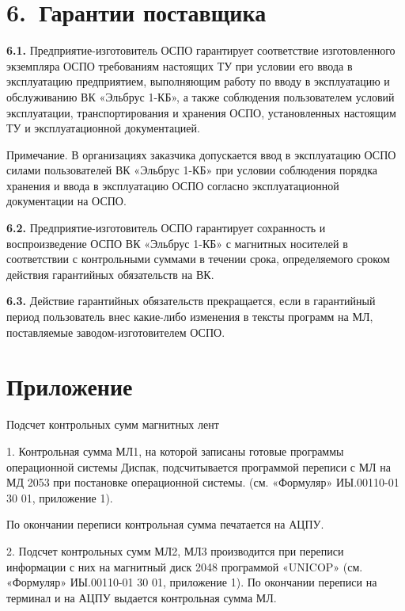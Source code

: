 \documentclass[11pt,a4paper]{article}
\begin{document}
\section*{6.~Гарантии поставщика}
\par\textbf{6.1.} Предприятие-изготовитель ОСПО гарантирует соответствие изготовленного экземпляра ОСПО требованиям настоящих ТУ при условии его ввода в эксплуатацию предприятием, выполняющим работу по вводу в эксплуатацию и обслуживанию ВК «Эльбрус 1-КБ», а также соблюдения пользователем условий эксплуатации, транспортирования и хранения ОСПО, установленных настоящим ТУ и эксплуатационной документацией.\par
Примечание. В организациях заказчика допускается ввод в эксплуатацию ОСПО силами пользователей ВК «Эльбрус 1-КБ» при условии соблюдения порядка хранения и ввода в эксплуатацию ОСПО согласно эксплуатационной документации на ОСПО.

\par\textbf{6.2.} Предприятие-изготовитель ОСПО гарантирует сохранность и воспроизведение ОСПО ВК «Эльбрус 1-КБ» с магнитных носителей в соответствии с контрольными суммами в течении срока, определяемого сроком действия гарантийных обязательств на ВК.\par
\par\textbf{6.3.} Действие гарантийных обязательств прекращается, если в гарантийный период пользователь внес какие-либо изменения в тексты программ на МЛ, поставляемые заводом-изготовителем ОСПО.\par
\section*{Приложение}
\begin{center}Подсчет контрольных сумм магнитных лент\end{center}
1. Контрольная сумма МЛ1, на которой записаны готовые программы операционной системы Диспак, подсчитывается программой переписи с МЛ на МД 2053 при постановке операционной системы. (см. «Формуляр» ИЫ.00110-01 30 01, приложение 1).

По окончании переписи контрольная сумма печатается на АЦПУ.

2. Подсчет контрольных сумм МЛ2, МЛ3 производится при переписи информации с них на магнитный диск 2048 программой «UNICOP» (см. «Формуляр» ИЫ.00110-01 30 01, приложение 1). По окончании переписи на терминал и на АЦПУ выдается контрольная сумма МЛ.
\end{document}
